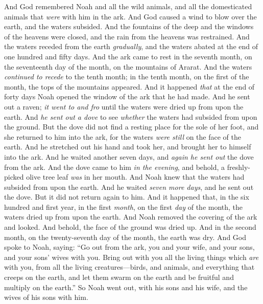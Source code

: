 \begin{biblechapter} %
 And God remembered Noah and all the wild animals, and all the domesticated animals that \textit{were} with him in the ark. And God caused a wind to blow over the earth, and the waters subsided.
\verse And the fountains of the deep and the windows of the heavens were closed, and the rain from the heavens was restrained.
\verse And the waters receded from the earth \textit{gradually}, and the waters abated at the end of one hundred and fifty days.
\verse And the ark came to rest in the seventh month, on the seventeenth day of the month, on the mountains of Ararat.
\verse And the waters \textit{continued to recede} to the tenth month; in the tenth month, on the first of the month, the tops of the mountains appeared.
\verse And it happened \textit{that} at the end of forty days Noah opened the window of the ark that he had made.
\verse And he sent out a raven; \textit{it went to and fro} until the waters were dried up from upon the earth.
\verse And \textit{he sent out a dove} to see \textit{whether} the waters had subsided from upon the ground.
\verse But the dove did not find a resting place for the sole of her foot, and she returned to him into the ark, for the waters \textit{were still} on the face of the earth. And he stretched out his hand and took her, and brought her to himself into the ark.
\verse And he waited another seven days, and \textit{again he sent out} the dove from the ark.
\verse And the dove came to him \textit{in the evening}, and behold, a freshly-picked olive tree leaf \textit{was} in her mouth. And Noah knew that the waters had subsided from upon the earth.
\verse And he waited \textit{seven more days}, and he sent out the dove. But it did not return again to him.
\verse And it happened that, in the six hundred and first year, in the first \textit{month}, on the first \textit{day} of the month, the waters dried up from upon the earth. And Noah removed the covering of the ark and looked. And behold, the face of the ground was dried up.
\verse And in the second month, on the twenty-seventh day of the month, the earth was dry.
\verse And God spoke to Noah, saying:
\verse “Go out from the ark, you and your wife, and your sons, and your sons’ wives with you.
\verse Bring out with you all the living things which \textit{are} with you, from all the living creatures—birds, and animals, and everything that creeps on the earth, and let them swarm on the earth and be fruitful and multiply on the earth.”
\verse So Noah went out, with his sons and his wife, and the wives of his sons with him.

\end{biblechapter}

